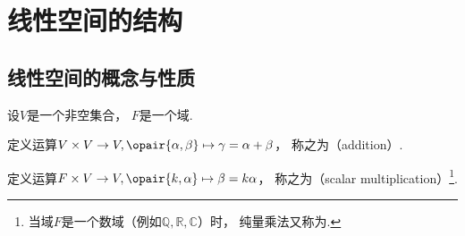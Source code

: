 \section{线性空间的结构}
\subsection{线性空间的概念与性质}
\begin{definition}
设\(V\)是一个非空集合，
\(F\)是一个域.

定义运算\(V\times V\to V,\opair{\alpha,\beta}\mapsto\gamma=\alpha+\beta\)，
称之为（addition）.

定义运算\(F\times V\to V,\opair{k,\alpha}\mapsto\beta=k\alpha\)，
称之为（scalar multiplication）\footnote{
	当域\(F\)是一个数域（例如\(\mathbb{Q},\mathbb{R},\mathbb{C}\)）时，
	纯量乘法又称为.
}.


\end{definition}
